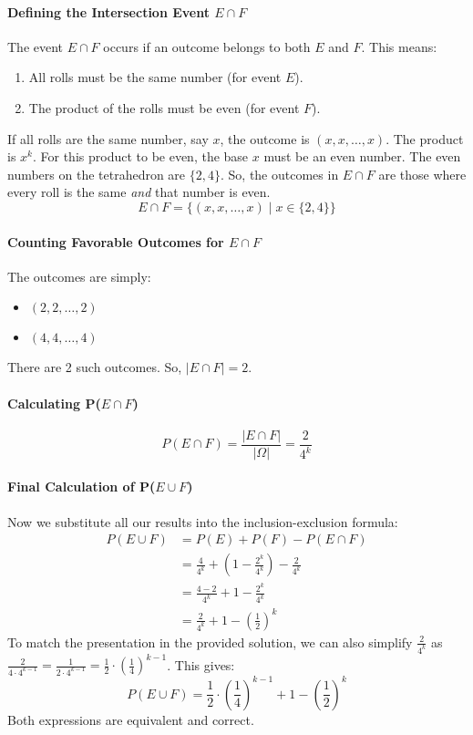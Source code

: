 \documentclass[11pt,a4paper]{article}
\begin{document}
\paragraph{Defining the Intersection Event $E \cap F$}
The event $E \cap F$ occurs if an outcome belongs to both $E$ and $F$. This means:
\begin{enumerate}
    \item All rolls must be the same number (for event $E$).
    \item The product of the rolls must be even (for event $F$).
\end{enumerate}
If all rolls are the same number, say $x$, the outcome is $(x, x, \dots, x)$. The product is $x^k$. For this product to be even, the base $x$ must be an even number. The even numbers on the tetrahedron are $\{2, 4\}$.
So, the outcomes in $E \cap F$ are those where every roll is the same \textit{and} that number is even.
\[
E \cap F = \{ (x, x, \dots, x) \mid x \in \{2, 4\} \}
\]
\paragraph{Counting Favorable Outcomes for $E \cap F$}
The outcomes are simply:
\begin{itemize}
    \item $(2, 2, \dots, 2)$
    \item $(4, 4, \dots, 4)$
\end{itemize}
There are 2 such outcomes. So, $|E \cap F| = 2$.

\paragraph{Calculating P($E \cap F$)}
\[
P(E \cap F) = \frac{|E \cap F|}{|\Omega|} = \frac{2}{4^k}
\]
\paragraph{Final Calculation of P($E \cup F$)}
Now we substitute all our results into the inclusion-exclusion formula:
\begin{align*}
P(E \cup F) &= P(E) + P(F) - P(E \cap F) \\
&= \frac{4}{4^k} + \left(1 - \frac{2^k}{4^k}\right) - \frac{2}{4^k} \\
&= \frac{4 - 2}{4^k} + 1 - \frac{2^k}{4^k} \\
&= \frac{2}{4^k} + 1 - \left(\frac{1}{2}\right)^k
\end{align*}
To match the presentation in the provided solution, we can also simplify $\frac{2}{4^k}$ as $\frac{2}{4 \cdot 4^{k-1}} = \frac{1}{2 \cdot 4^{k-1}} = \frac{1}{2} \cdot \left(\frac{1}{4}\right)^{k-1}$. This gives:
\[
P(E \cup F) = \frac{1}{2} \cdot \left(\frac{1}{4}\right)^{k-1} + 1 - \left(\frac{1}{2}\right)^k
\]
Both expressions are equivalent and correct.
\end{document}

